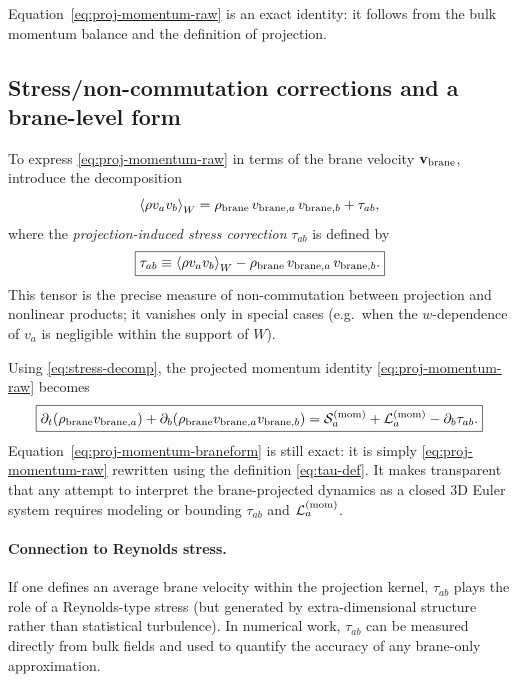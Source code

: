 \documentclass[11pt]{article}
\begin{document}
Equation~\eqref{eq:proj-momentum-raw} is an exact identity: it follows from the bulk momentum balance and the definition of projection.

\subsection{Stress/non-commutation corrections and a brane-level form}
\label{app:momentum-stress}

To express \eqref{eq:proj-momentum-raw} in terms of the brane velocity $\mathbf{v}_{\rm brane}$, introduce the decomposition
\begin{equation}
\left\langle \rho v_a v_b \right\rangle_W
=
\rho_{\rm brane}\,v_{{\rm brane},a}\,v_{{\rm brane},b}
+
\tau_{ab},
\label{eq:stress-decomp}
\end{equation}
where the \emph{projection-induced stress correction} $\tau_{ab}$ is defined by
\begin{equation}
\boxed{
\tau_{ab}
\equiv
\left\langle \rho v_a v_b \right\rangle_W
-
\rho_{\rm brane}\,v_{{\rm brane},a}\,v_{{\rm brane},b}.
}
\label{eq:tau-def}
\end{equation}
This tensor is the precise measure of non-commutation between projection and nonlinear products; it vanishes only in special cases (e.g.\ when the $w$-dependence of $v_a$ is negligible within the support of $W$).

Using \eqref{eq:stress-decomp}, the projected momentum identity \eqref{eq:proj-momentum-raw} becomes
\begin{equation}
\boxed{
\partial_t(\rho_{\rm brane} v_{{\rm brane},a})
+
\partial_b\!\left(\rho_{\rm brane} v_{{\rm brane},a} v_{{\rm brane},b}\right)
=
\mathcal{S}^{({\rm mom})}_a
+
\mathcal{L}^{({\rm mom})}_a
-
\partial_b\tau_{ab}.
}
\label{eq:proj-momentum-braneform}
\end{equation}
Equation~\eqref{eq:proj-momentum-braneform} is still exact: it is simply \eqref{eq:proj-momentum-raw} rewritten using the definition \eqref{eq:tau-def}. It makes transparent that any attempt to interpret the brane-projected dynamics as a closed 3D Euler system requires modeling or bounding $\tau_{ab}$ and $\mathcal{L}^{({\rm mom})}_a$.

\paragraph{Connection to Reynolds stress.}
If one defines an average brane velocity within the projection kernel, $\tau_{ab}$ plays the role of a Reynolds-type stress (but generated by extra-dimensional structure rather than statistical turbulence). In numerical work, $\tau_{ab}$ can be measured directly from bulk fields and used to quantify the accuracy of any brane-only approximation.
\end{document}
